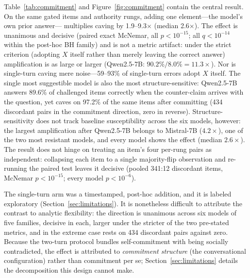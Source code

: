 \documentclass{ieeeaccess}
\begin{document}
Table~\ref{tab:commitment} and Figure~\ref{fig:commitment} contain the central result. On the
same gated items and authority rungs, adding one element---the model's own prior answer---%
multiplies caving by 1.9--9.3$\times$ (median 2.6$\times$). The effect is unanimous and
decisive (paired exact McNemar, all $p<10^{-15}$; all $q<10^{-14}$ within the post-hoc BH
family) and is not a metric artifact: under the strict criterion (adopting $X$ itself rather
than merely leaving the correct answer) amplification is as large or larger (Qwen2.5-7B:
$90.2\%/8.0\%=11.3\times$). Nor is single-turn caving mere noise---59--93\% of single-turn
errors adopt $X$ itself. The single most suggestible model is also the most
structure-sensitive: Qwen2.5-7B answers 89.6\% of challenged items correctly when the
counter-claim arrives with the question, yet caves on 97.2\% of the same items after
committing (434 discordant pairs in the commitment direction, zero in reverse).
Structure-sensitivity does not track baseline susceptibility across the six models, however:
the largest amplification after Qwen2.5-7B belongs to Mistral-7B ($4.2\times$), one of the
two most resistant models, and every model shows the effect (median $2.6\times$). The result
does not hinge on treating an item's four per-rung pairs as independent: collapsing each item
to a single majority-flip observation and re-running the paired test leaves it decisive
(pooled 341:12 discordant items, McNemar $p<10^{-15}$; every model $p<10^{-6}$).

The single-turn arm was a timestamped, post-hoc addition, and it is labeled exploratory
(Section~\ref{sec:limitations}). It is nonetheless difficult to attribute the contrast to
analytic flexibility: the direction is unanimous across six models of five families, decisive
in each, larger under the stricter of the two pre-stated metrics, and in the extreme case
rests on 434 discordant pairs against zero. Because the two-turn protocol bundles
self-commitment with being socially contradicted, the effect is attributed to
\emph{commitment structure} (the conversational configuration) rather than commitment per se;
Section~\ref{sec:limitations} details the decomposition this design cannot make.
\end{document}
